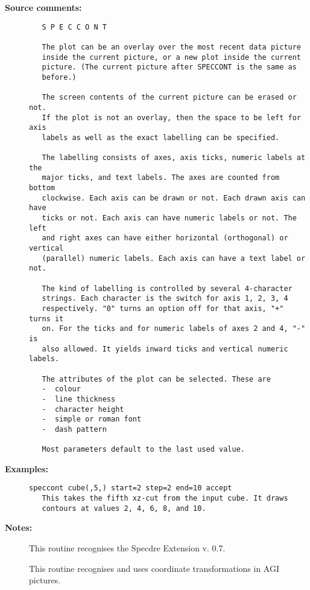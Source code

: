 \begin{description}
\item [{\bf Source comments:}]
\begin{verbatim}
   S P E C C O N T

   The plot can be an overlay over the most recent data picture
   inside the current picture, or a new plot inside the current
   picture. (The current picture after SPECCONT is the same as
   before.)

   The screen contents of the current picture can be erased or not.
   If the plot is not an overlay, then the space to be left for axis
   labels as well as the exact labelling can be specified.

   The labelling consists of axes, axis ticks, numeric labels at the
   major ticks, and text labels. The axes are counted from bottom
   clockwise. Each axis can be drawn or not. Each drawn axis can have
   ticks or not. Each axis can have numeric labels or not. The left
   and right axes can have either horizontal (orthogonal) or vertical
   (parallel) numeric labels. Each axis can have a text label or not.

   The kind of labelling is controlled by several 4-character
   strings. Each character is the switch for axis 1, 2, 3, 4
   respectively. "0" turns an option off for that axis, "+" turns it
   on. For the ticks and for numeric labels of axes 2 and 4, "-" is
   also allowed. It yields inward ticks and vertical numeric labels.

   The attributes of the plot can be selected. These are
   -  colour
   -  line thickness
   -  character height
   -  simple or roman font
   -  dash pattern

   Most parameters default to the last used value.
\end{verbatim}

\item [{\bf Examples:}]
\begin{verbatim}
speccont cube(,5,) start=2 step=2 end=10 accept
   This takes the fifth xz-cut from the input cube. It draws
   contours at values 2, 4, 6, 8, and 10.
\end{verbatim}

\item [{\bf Notes:}]
This routine recognises the Specdre Extension v. 0.7.

This routine recognises and uses coordinate transformations in
AGI pictures.
\end{description}
